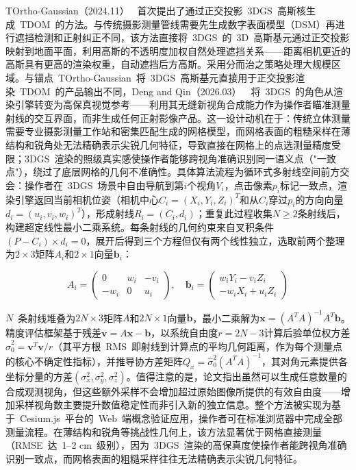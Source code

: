 TOrtho-Gaussian（2024.11）~\cite{2411_19594} 首次提出了通过正交投影~3DGS~高斯核生成~TDOM~的方法。与传统摄影测量管线需要先生成数字表面模型（DSM）再进行遮挡检测和正射纠正不同，该方法直接将~3DGS~的~3D~高斯基元通过正交投影映射到地面平面，利用高斯的不透明度加权自然处理遮挡关系——距离相机更近的高斯具有更高的渲染权重，自动遮挡后方高斯。采用分而治之策略处理大规模区域。与锚点~TOrtho-Gaussian~将~3DGS~高斯基元直接用于正交投影渲染~TDOM~的产品输出不同，Deng and Qin（2026.03）~\cite{2603_24716}~将~3DGS~的角色从渲染引擎转变为高保真视觉参考——利用其无缝新视角合成能力作为操作者瞄准测量射线的交互界面，而非生成任何正射影像产品。这一设计动机在于：传统立体测量需要专业摄影测量工作站和密集匹配生成的网格模型，而网格表面的粗糙采样在薄结构和锐角处无法精确表示尖锐几何特征，导致直接在网格上的点选测量精度受限；3DGS~渲染的照级真实感使操作者能够跨视角准确识别同一语义点（"一致点"），绕过了底层网格的几何不准确性。具体算法流程为循环式多射线空间前方交会：操作者在~3DGS~场景中自由导航到第$i$个视角$V_i$，点击像素$p_i$标记一致点，渲染引擎返回当前相机位姿（相机中心$C_i = (X_i, Y_i, Z_i)^T$和从$C_i$穿过$p_i$的方向向量$d_i = (u_i, v_i, w_i)^T$），形成射线$R_i = (C_i, d_i)$；重复此过程收集$N \geq 2$条射线后，构建超定线性最小二乘系统。每条射线的几何约束来自叉积条件$(P - C_i) \times d_i = 0$，展开后得到三个方程但仅有两个线性独立，选取前两个整理为$2 \times 3$矩阵$A_i$和$2 \times 1$向量$\mathbf{b}_i$：

\begin{equation*}
A_i = \begin{pmatrix} 0 & w_i & -v_i \\ -w_i & 0 & u_i \end{pmatrix}, \quad
\mathbf{b}_i = \begin{pmatrix} w_i Y_i - v_i Z_i \\ -w_i X_i + u_i Z_i \end{pmatrix}
\end{equation*}

$N$~条射线堆叠为$2N \times 3$矩阵$A$和$2N \times 1$向量$\mathbf{b}$，最小二乘解为$\mathbf{x} = (A^TA)^{-1}A^T\mathbf{b}$。精度评估框架基于残差$\mathbf{v} = A\mathbf{x} - \mathbf{b}$，以系统自由度$r = 2N - 3$计算后验单位权方差$\hat{\sigma}_0^2 = \mathbf{v}^T\mathbf{v}/r$（其平方根~RMS~即射线到计算点的平均几何距离，作为每个测量点的核心不确定性指标），并推导协方差矩阵$Q_x = \hat{\sigma}_0^2(A^TA)^{-1}$，其对角元素提供各坐标分量的方差$(\sigma_x^2, \sigma_y^2, \sigma_z^2)$。值得注意的是，论文指出虽然可以生成任意数量的合成观测视角，但这些额外采样不会增加超过原始图像所提供的有效自由度——增加采样视角数主要提升数值稳定性而非引入新的独立信息。整个方法被实现为基于~Cesium.js~平台的~Web~端概念验证应用，操作者可在标准浏览器中完成全部测量流程。在薄结构和锐角等挑战性几何上，该方法显著优于网格直接测量（RMSE~达~1--2 cm~级别），因为~3DGS~渲染的高保真度使操作者能跨视角准确识别一致点，而网格表面的粗糙采样往往无法精确表示尖锐几何特征。

